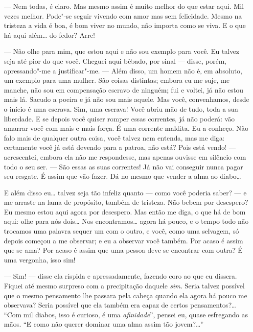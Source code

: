 --- Nem todas, é claro. Mas mesmo assim é muito melhor do que estar aqui.
Mil vezes melhor. Pode"-se seguir vivendo com amor mas sem felicidade.
Mesmo na tristeza a vida é boa, é bom viver no mundo, não importa como
se viva. E o que há aqui além\ldots{} do fedor? Arre!


--- Não olhe para mim, que estou aqui e não sou exemplo para você. Eu
talvez seja até pior do que você. Cheguei aqui bêbado, por sinal ---
disse, porém, apressando"-me a justificar"-me. --- Além disso, um homem
não é, em absoluto, um exemplo para uma mulher. São coisas distintas;
embora eu me suje, me manche, não sou em compensação escravo de
ninguém; fui e voltei, já não estou mais lá. Sacudo a poeira e já não
sou mais aquele. Mas você, convenhamos, desde o início é uma escrava.
Sim, uma escrava! Você abriu mão de tudo, toda a sua liberdade. E se
depois você quiser romper essas correntes, já não poderá: vão amarrar
você com mais e mais força. É uma corrente maldita. Eu a conheço. Não
falo mais de qualquer outra coisa, você talvez nem entenda, mas me
diga: certamente você já está devendo para a patroa, não está? Pois
está vendo! --- acrescentei, embora ela não me respondesse, mas apenas
ouvisse em silêncio com todo o seu ser. --- São essas as suas correntes!
Já não vai conseguir nunca pagar seu resgate. É assim que vão fazer. Dá
no mesmo que vender a alma ao diabo\ldots{}

E além disso eu\ldots{} talvez seja tão infeliz quanto --- como você poderia
saber? --- e me arraste na lama de propósito, também de tristeza. Não
bebem por desespero? Eu mesmo estou aqui agora por desespero. Mas então
me diga, o que há de bom aqui: olhe para nós dois\ldots{} Nos encontramos\ldots{}
agora há pouco, e o tempo todo não trocamos uma palavra sequer um com o
outro, e você, como uma selvagem, só depois começou a me observar; e eu
a observar você também. Por acaso é assim que se ama? Por acaso é assim
que uma pessoa deve se encontrar com outra? É uma vergonha, isso sim!

--- Sim! --- disse ela ríspida e apressadamente, fazendo coro ao que eu
dissera. Fiquei até mesmo surpreso com a precipitação daquele \textit{sim}.
Seria talvez possível que o mesmo pensamento lhe passara pela cabeça
quando ela agora há pouco me observava? Seria possível que ela também
era capaz de certos pensamentos?\ldots{} ``Com mil diabos, isso é curioso, é
uma \textit{afinidade}'', pensei eu, quase esfregando as mãos. ``E como
não querer dominar uma alma assim tão jovem?\ldots{}''

